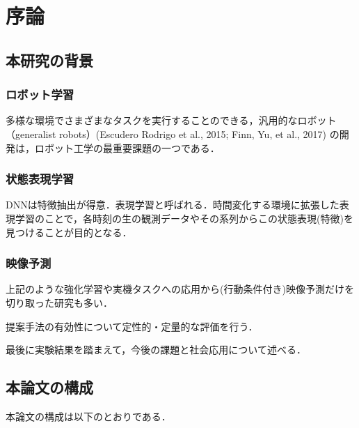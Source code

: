 \chapter{序論}
\label{chap:introduction}
\section{本研究の背景}

\subsection{ロボット学習}

多様な環境でさまざまなタスクを実行することのできる，汎用的なロボット（generalist robots）(Escudero Rodrigo et al., 2015; Finn, Yu, et al., 2017) の開発は，ロボット工学の最重要課題の一つである．

\subsection{状態表現学習}
DNNは特徴抽出が得意．表現学習と呼ばれる．時間変化する環境に拡張した表現学習のことで，各時刻の生の観測データやその系列からこの状態表現(特徴)を見つけることが目的となる．

\subsection{映像予測}
上記のような強化学習や実機タスクへの応用から(行動条件付き)映像予測だけを切り取った研究も多い．

提案手法の有効性について定性的・定量的な評価を行う．

最後に実験結果を踏まえて，今後の課題と社会応用について述べる．

\section{本論文の構成}
本論文の構成は以下のとおりである．







